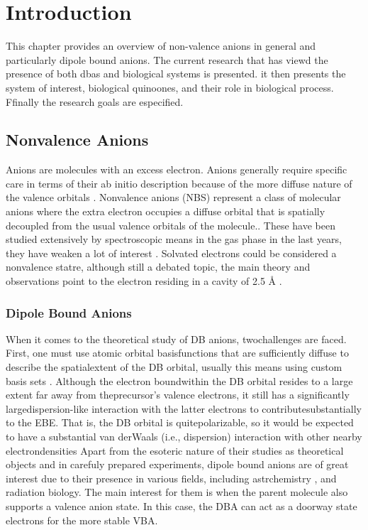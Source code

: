 \chapter{Introduction}\label{ch:introduction}

This chapter provides an overview of non-valence anions in general and particularly dipole bound anions. The current research that has viewd the presence of both dbas and biological systems is presented. it then presents the system of interest, biological quinoones, and their role in biological process. Ffinally the research goals are especified.

\section{Nonvalence Anions}
Anions are molecules with an excess electron. Anions generally require specific care in terms of their ab initio description because of the more diffuse nature of the valence
orbitals \cite{simons2008molecular,simons2023molecular}.
Nonvalence anions (NBS)  represent a class of molecular anions where the extra electron occupies a diffuse orbital that is spatially decoupled from the usual valence orbitals of the molecule.\cite{jordan2003theory}. These have been studied extensively by spectroscopic means in the gas phase in the last years, they have weaken a lot of interest \cite{kang2024reaction}.
Solvated electrons could be considered a nonvalence statre, although still a debated topic, the main theory and observations point to the electron residing in a cavity of 2.5 \r{A} \cite{herbert2017hydrated}.

\subsection{Dipole Bound Anions}
When it comes to the theoretical study of DB anions, twochallenges are faced. First, one must use atomic orbital basisfunctions that are sufficiently diffuse to describe the spatialextent of the DB orbital, usually this means using custom basis sets \cite{skurski2000choose}.
Although the electron boundwithin the DB orbital resides to a large extent far away from theprecursor's valence electrons, it still has a significantly largedispersion-like interaction with the latter electrons to contributesubstantially to the EBE. That is, the DB orbital is quitepolarizable, so it would be expected to have a substantial van derWaals (i.e., dispersion) interaction with other nearby electrondensities\cite{gutowski1996contribution}
Apart from the esoteric nature of their studies as theoretical objects and in carefuly prepared experiments, dipole bound anions are of great interest due to their presence in various fields, including astrchemistry \cite{fortenberry2015interstellar}, and radiation biology\cite{narayanan2023secondary,sedmidubska2024interaction}. The main interest for them is when the parent molecule also supports a valence anion state. In this case, the DBA can act as a doorway state electrons for the more stable VBA.


